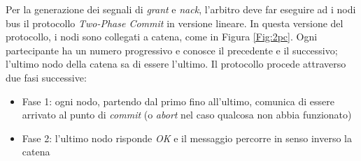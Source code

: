 Per la generazione dei segnali di \textit{grant} e \textit{nack}, l'arbitro deve far eseguire ad i nodi bus il protocollo \textit{Two-Phase Commit} in versione lineare. In questa versione del protocollo, i nodi sono collegati a catena, come in Figura \ref{Fig:2pc}. Ogni partecipante ha un numero progressivo e conosce il precedente e il successivo; l'ultimo nodo della catena sa di essere l'ultimo. Il protocollo procede attraverso due fasi successive:
\begin{itemize}
\item Fase 1: ogni nodo, partendo dal primo fino all'ultimo, comunica di essere arrivato al punto di \textit{commit} (o \textit{abort} nel caso qualcosa non abbia funzionato)
\item Fase 2: l'ultimo nodo risponde \textit{OK} e il messaggio percorre in senso inverso la catena
\end{itemize}

